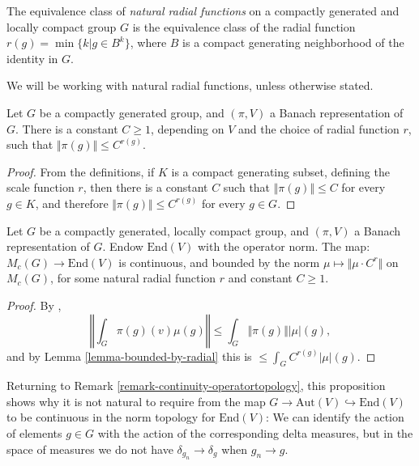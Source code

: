 \begin{definition}
 \label{definition-radial-natural}
The equivalence class of {\it natural radial functions} on a  compactly generated and locally compact group $G$ is the equivalence class of the radial function $r(g) = \min\{k| g\in B^k\}$, where $B$ is a compact generating neighborhood of the identity in $G$. 
\end{definition}


We will be working with natural radial functions, unless otherwise stated.


\begin{lemma}
\label{lemma-bounded-by-radial}
Let $G$ be a compactly generated group, and $(\pi,V)$ a Banach representation of $G$.
There is a constant $C\ge 1$, depending on $V$ and the choice of radial function $r$, such that $\Vert \pi(g)\Vert \le C^{r(g)}$.
\end{lemma}

\begin{proof}
 From the definitions, if $K$ is a compact generating subset, defining the scale function $r$, then there is a constant $C$ such that $\Vert\pi(g)\Vert \le C$ for every $g\in K$, and therefore $\Vert\pi(g)\Vert \le C^{r(g)}$ for every $g\in G$.
\end{proof}

\begin{proposition}
\label{proposition-integral-Banach}
Let $G$ be a compactly generated, locally compact group, and $(\pi, V)$ a Banach representation of $G$. Endow $\text{End}(V)$ with the operator norm. The map: $M_c(G)\to \text{End}(V)$ is continuous, and bounded by the norm $\mu\mapsto \Vert \mu \cdot C^r\Vert$ on $M_c(G)$, for some natural radial function $r$ and constant $C \ge 1$.
\end{proposition}

\begin{proof}
 By \cite[Theorem 3.29]{Rudin}, 
 $$
 \left\Vert \int_G \pi(g)(v) \mu(g)\right\Vert \le \int_G \Vert \pi(g)\Vert |\mu|(g),
 $$
 and by Lemma \ref{lemma-bounded-by-radial} this is $\le \int_G C^{r(g)} |\mu|(g)$. 
\end{proof}


\begin{remark}
\label{remark-continuity-algebras}
Returning to Remark \ref{remark-continuity-operatortopology},  this proposition shows why it is not natural to require from the map $G\to \text{Aut}(V)\hookrightarrow \text{End}(V)$ to be continuous in the norm topology for $\text{End}(V)$: We can identify the action of elements $g\in G$ with the action of the corresponding delta measures, but in the space of measures we do not have $\delta_{g_n}\to \delta_g$ when $g_n\to g$.
\end{remark}


